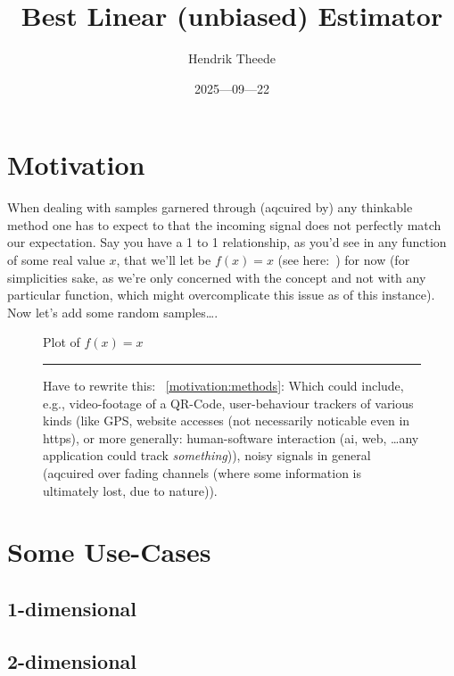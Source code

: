 \documentclass{article}
\title{Best Linear (unbiased) Estimator}
\author{Hendrik Theede}
\date{2025---09---22}
\begin{document}
\maketitle
\section{Motivation}
When dealing with samples garnered through (aqcuired by) any thinkable method\label{motivation:methods} one has to expect to that the incoming signal does not perfectly match our expectation. Say you have a 1 to 1 relationship, as you'd see in any function of some real value $x$, that we'll let be $f(x)=x$ (see here:~) for now (for simplicities sake, as we're only concerned with the concept and not with any particular function, which might overcomplicate this issue as of this instance). Now let's add some random samples\ldots.
\begin{figure}[h!]
    \centering
{}
\caption{Plot of $f(x)=x$\label{fig:fx}}
\end{figure}

\begin{figure}[b]
\hrule
\vspace{1em}
Have to rewrite this:
~\ref{motivation:methods}: Which could include, e.g., video-footage of a QR-Code, user-behaviour trackers of various kinds (like GPS, website accesses (not necessarily noticable even in https), or more generally: human-software interaction (ai, web, \ldots any application could track \textit{something})), noisy signals in general (aqcuired over fading channels (where some information is ultimately lost, due to nature\cite{fadingchannels})).
\end{figure}


\newpage
\section{Some Use-Cases}
\subsection{1-dimensional}
\subsection{2-dimensional}
\end{document}
